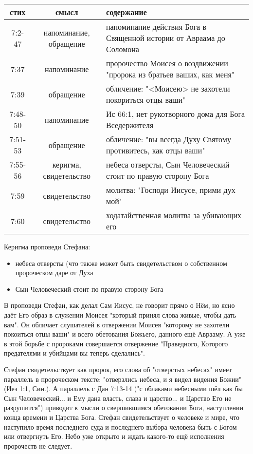 \begin{center}
	\begin{longtable}{ |c|c|p{}| } 
		\hline
		стих & смысл & содержание \\
		\hline\hline
		7:2-47 & напоминание, обращение & напоминание действия Бога в Священной истории от Авраама до Соломона \\
		7:37 & напоминание & пророчество Моисея о воздвижении "пророка из братьев ваших, как меня" \\
		7:39 & обращение & обличение: "<Моисею> не захотели покориться отцы ваши" \\
		7:48-50 & напоминание & Ис 66:1, нет рукотворного дома для Бога Вседержителя \\
		7:51-53 & обращение & обличение: "вы всегда Духу Святому противитесь, как отцы ваши" \\
		7:55-56 & керигма, свидетельство & небеса отверсты, Сын Человеческий стоит по правую сторону Бога \\
		7:59 & свидетельство & молитва: "Господи Иисусе, прими дух мой" \\
		7:60 & свидетельство & ходатайственная молитва за убивающих его \\
		\hline
	\end{longtable}
\end{center}

Керигма проповеди Стефана:
\begin{itemize}
	\item небеса отверсты (что также может быть свидетельством о собственном пророческом даре от Духа
	\item Сын Человеческий стоит по правую сторону Бога
\end{itemize}

В проповеди Стефан, как делал Сам Иисус, не говорит прямо о Нём, но ясно даёт Его образ в служении Моисея "который принял слова живые, чтобы дать вам".
Он обличает слушателей в отвержении Моисея "которому не захотели покоиться отцы ваши" и всего обетования Божьего, данного ещё Аврааму.
А уже в этой борьбе с пророками совершается отвержение "Праведного, Которого предателями и убийцами вы теперь сделались".

Стефан свидетельствует как пророк, его слова об "отверстых небесах" имеет параллель в пророческом тексте: "отверзлись небеса, и я видел видения Божии" (Иез 1:1, Син.).
А параллель с Дан 7:13-14 ("с облаками небесными шёл как бы Сын Человеческий... и Ему дана власть, слава и царство... и Царство Его не разрушится") приводит к мысли о свершившимся обетовании Бога, наступлении конца времени и Царства Бога.
Стефан свидетельствует о человеке и мире, что наступило время последнего суда и последнего выбора человека быть с Богом или отвергнуть Его.
Небо уже открыто и ждать какого-то ещё исполнения пророчеств не следует.

